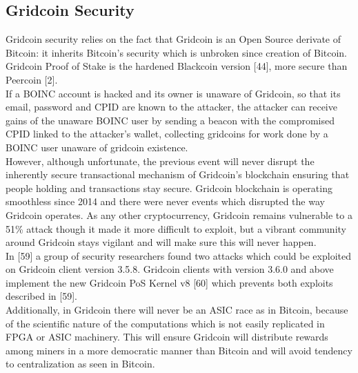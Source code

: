 \subsection{Gridcoin Security}

Gridcoin security relies on the fact that Gridcoin is an Open Source derivate of Bitcoin: it inherits Bitcoin's security which is unbroken since creation of Bitcoin. Gridcoin Proof of Stake is the hardened Blackcoin version [44], more secure than Peercoin [2].\\ 

If a BOINC account is hacked and its owner is unaware of Gridcoin, so that its email, password and CPID are known to the attacker, the attacker can receive gains of the unaware BOINC user by sending a beacon with the compromised CPID linked to the attacker's wallet, collecting gridcoins for work done by a BOINC user unaware of gridcoin existence.\\

However, although unfortunate, the previous event will never disrupt the inherently secure transactional mechanism of Gridcoin's blockchain ensuring that people holding and transactions stay secure. Gridcoin blockchain is operating smoothless since 2014 and there were never events which disrupted the way Gridcoin operates. As any other cryptocurrency, Gridcoin remains vulnerable to a 51\% attack though it made it more difficult to exploit, but a vibrant community around Gridcoin stays vigilant and will make sure this will never happen.\\

In [59] a group of security researchers found two attacks which could be exploited on Gridcoin client version 3.5.8. Gridcoin clients with version 3.6.0 and above implement the new Gridcoin PoS Kernel v8 [60] which prevents both exploits described in [59].\\

Additionally, in Gridcoin there will never be an ASIC race as in Bitcoin, because of the scientific nature of the computations which is not easily replicated in FPGA or ASIC machinery. This will ensure Gridcoin will distribute rewards among miners in a more democratic manner than Bitcoin and will avoid tendency to centralization as seen in Bitcoin.